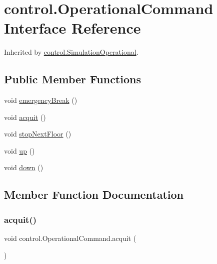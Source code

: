 \hypertarget{interfacecontrol_1_1_operational_command}{}\section{control.\+Operational\+Command Interface Reference}
\label{interfacecontrol_1_1_operational_command}


Inherited by \mbox{\hyperlink{classcontrol_1_1_simulation_operational}{control.\+Simulation\+Operational}}.

\subsection*{Public Member Functions}
\begin{DoxyCompactItemize}
\item 
void \mbox{\hyperlink{interfacecontrol_1_1_operational_command_a63858b26e71770bb4ae232277d54b8a6}{emergency\+Break}} ()
\item 
void \mbox{\hyperlink{interfacecontrol_1_1_operational_command_ab48776483b91f60855a69d7671e02446}{acquit}} ()
\item 
void \mbox{\hyperlink{interfacecontrol_1_1_operational_command_a148c09334384843727fb7b1665252ff1}{stop\+Next\+Floor}} ()
\item 
void \mbox{\hyperlink{interfacecontrol_1_1_operational_command_a23231ea40f8bf5cd07b864238f258b5f}{up}} ()
\item 
void \mbox{\hyperlink{interfacecontrol_1_1_operational_command_a3d1ecf1ec7ad55a3f3e02d2fc9df7e18}{down}} ()
\end{DoxyCompactItemize}


\subsection{Member Function Documentation}
\mbox{\label{interfacecontrol_1_1_operational_command_ab48776483b91f60855a69d7671e02446}} 
\subsubsection{\texorpdfstring{acquit()}{acquit()}}
{\footnotesize\ttfamily void control.\+Operational\+Command.\+acquit (\begin{DoxyParamCaption}{ }\end{DoxyParamCaption})}



